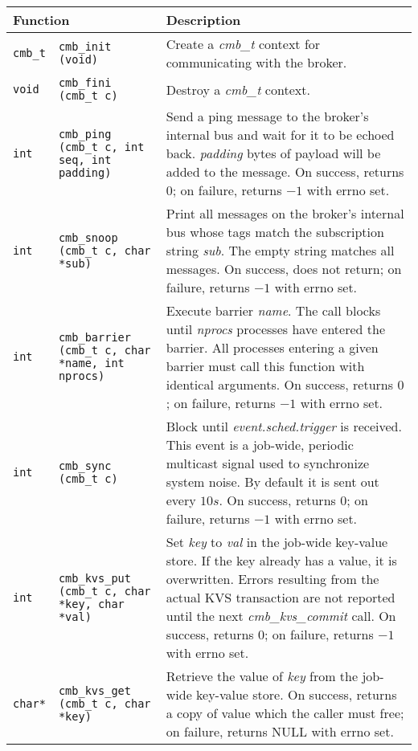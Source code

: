 \begin{table}
\centering
\begin{tabular}{|p{0.7cm}p{5cm}|p{9cm}|}\hline
\multicolumn{2}{|l|}{\textbf{Function}}
  & \textbf{Description} \\
\hline
{\tt cmb\_t} & {\tt cmb\_init (void)}
  & Create a {\em cmb\_t} context for communicating with the broker.\\
{\tt void} & {\tt cmb\_fini (cmb\_t c)}
  & Destroy a {\em cmb\_t} context.\\
\hline
{\tt int} & {\tt cmb\_ping (cmb\_t c, int seq, int padding)}
  & Send a ping message to the broker's internal bus and wait for it
    to be echoed back.  {\em padding} bytes of payload will be added to
    the message.
    On success, returns $0$; on failure, returns $-1$ with errno set.\\
\hline
{\tt int} & {\tt cmb\_snoop (cmb\_t c, char {*sub})}
  & Print all messages on the broker's internal bus whose tags match the
    subscription string {\em sub}.  The empty string matches all messages.
    On success, does not return; on failure, returns $-1$ with errno set.\\
\hline
{\tt int}
  & {\tt cmb\_barrier (cmb\_t c, char {*name}, int nprocs)}
  & Execute barrier {\em name}.  The call blocks until {\em nprocs}
    processes have entered the barrier.  
    All processes entering a given barrier must call this function with
    identical arguments.
    On success, returns $0$; on failure, returns $-1$ with errno set.\\
\hline
{\tt int}
  & {\tt cmb\_sync (cmb\_t c)}
  & Block until {\em event.sched.trigger} is received.  This event is
    a job-wide, periodic multicast signal used to synchronize system noise.
    By default it is sent out every $10s$.
    On success, returns $0$; on failure, returns $-1$ with errno set.\\
\hline
{\tt int}
  & {\tt cmb\_kvs\_put (cmb\_t c, char {*key}, char {*val})}
  & Set {\em key} to {\em val} in the job-wide key-value store.
    If the key already has a value, it is overwritten.
    Errors resulting from the actual KVS transaction are not reported
    until the next {\em cmb\_kvs\_commit} call.
    On success, returns $0$; on failure, returns $-1$ with errno set.\\
{\tt {char*}}
  & {\tt cmb\_kvs\_get (cmb\_t c, char {*key})}
  & Retrieve the value of {\em key} from the job-wide key-value store.
    On success, returns a copy of value which the caller must free;
    on failure, returns NULL with errno set.\\

\end{tabular}
\end{table}
